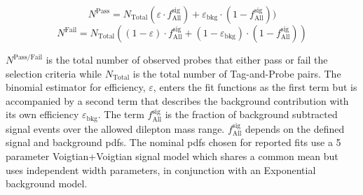\begin{equation}
	N^{\text{Pass}} = N_{\text{Total}} (\varepsilon \cdot f^{\text{sig}}_{\text{All}} ) +  \varepsilon_{\text{bkg}} \cdot (1-f^{\text{sig} }_{\text{All}}) )
\end{equation} 
\begin{equation}
	N^{\text{Fail}} = N_{\text{Total}} ( (1-\varepsilon) \cdot f^{\text{sig}}_{\text{All}} +   (1-\varepsilon_{\text{bkg}}) \cdot (1-f^{\text{sig}}_{\text{All}}) )
\end{equation}

$N^{\text{Pass/Fail}}$ is the total number of observed probes that either pass or fail the selection criteria while $N_{\text{Total}}$ is the total number of Tag-and-Probe pairs.
The binomial estimator for efficiency, $\varepsilon$, enters the fit functions as the first term but is accompanied by a second term that describes the background contribution with its own efficiency $\varepsilon_{\text{bkg}}$.  The term $f^{\text{sig}}_{\text{All}}$ is the fraction of background subtracted signal events over the allowed dilepton mass range.  $f^{\text{sig}}_{\text{All}}$ depends on the defined signal and background pdfs. The nominal pdfs chosen for reported fits use a 5 parameter Voigtian+Voigtian signal model which shares a common mean but uses independent width parameters, in conjunction with an Exponential background model. 








\FloatBarrier

